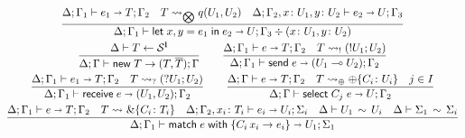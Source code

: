 \begin{figure}[h!]
\begin{gather*}
    \frac{
      \algtypeout[\kindEnv ; \varEnv_1]{e_1}{T}{\varEnv_2}
      \quad
      T \Extract{\bigotimes} q(U_1, U_2)
      \quad
      \algtypeout[\kindEnv; \varEnv_2, x\colon U_1, y\colon U_2]{e_2}{U}{\varEnv_3}
    }{
      \algtypeout[\kindEnv;
      \varEnv_1]{\binlete{x}{y}{e_1}{e_2}}{U}{\varEnv_3} \div (x\colon U_1, y\colon U_2)
    }
    \\
    \frac{
      \kindEnv \Alg T \leftarrow \kinds^{\Lin}
    }{
      \kindEnv;\varEnv \Alg \newe{T} \rightarrow (T, \dual{T}); \varEnv
    }
    \qquad
    \frac{
      \algtypeout[\kindEnv;\varEnv_1]{e}{T}{\varEnv_2}
      \quad
      T\Extract{!} (!U_1;U_2)
    }{
      \algtypeout[\kindEnv;\varEnv_1]{\sendce e}{(U_1\multimap U_2)}{\varEnv_2}
    }
    \\
    \frac{
      \algtypeout[\kindEnv;\varEnv_1]{e_1}{T}{\varEnv_2}
      \quad T
      \Extract{?} (?U_1;U_2)
    }{
      \algtypeout[\kindEnv;\varEnv_1]{\recve e}{(U_1,U_2)}{\varEnv_2}
    }
    \qquad
    \frac{
      \algtypeout[\kindEnv;\varEnv]{e}{T}{\varEnv_2}
      \quad
      T \Extract{\oplus}\oplus\{C_i\colon U_i\}
      \quad
      j \in I
    }{
      \algtypeout[\kindEnv;\varEnv]{\selecte{C_j}{e}}{U}{\varEnv_2}
    }
    \\
    \frac{
      \algtypeout[\kindEnv;\varEnv_1]{e}{T}{\varEnv_2}
      \quad
      T \Extract{} \&\{C_i\colon T_i\}
      \quad 
      \algtypeout[\kindEnv;\varEnv_2, x_i\colon T_i]{e_i}{U_i}{\Sigma_i}
      \quad 
      \typeequiv{U_1}{U_i}
      \quad
      \ctxequiv{\Sigma_1}{\Sigma_i} 
    }{
      \algtypeout[\kindEnv;\varEnv_1]{\matche{e}{\{C_i\,x_i \rightarrow e_i\}}}{U_1}{\Sigma_1}
    }
  \\

\end{gather*}
\end{figure}
